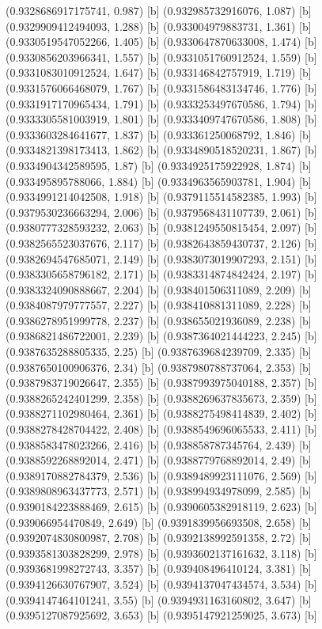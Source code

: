 {{{(0.9328686917175741, 0.987) [b] 
(0.932985732916076, 1.087) [b] 
(0.9329909412494093, 1.288) [b] 
(0.933004979883731, 1.361) [b] 
(0.9330519547052266, 1.405) [b] 
(0.9330647870633008, 1.474) [b] 
(0.9330856203966341, 1.557) [b] 
(0.9331051760912524, 1.559) [b] 
(0.9331083010912524, 1.647) [b] 
(0.933146842757919, 1.719) [b] 
(0.9331576066468079, 1.767) [b] 
(0.9331586483134746, 1.776) [b] 
(0.9331917170965434, 1.791) [b] 
(0.9333253497670586, 1.794) [b] 
(0.9333305581003919, 1.801) [b] 
(0.9333409747670586, 1.808) [b] 
(0.9333603284641677, 1.837) [b] 
(0.933361250068792, 1.846) [b] 
(0.9334821398173413, 1.862) [b] 
(0.9334890518520231, 1.867) [b] 
(0.9334904342589595, 1.87) [b] 
(0.9334925175922928, 1.874) [b] 
(0.933495895788066, 1.884) [b] 
(0.9334963565903781, 1.904) [b] 
(0.9334991214042508, 1.918) [b] 
(0.9379115514582385, 1.993) [b] 
(0.9379530236663294, 2.006) [b] 
(0.9379568431107739, 2.061) [b] 
(0.9380777328593232, 2.063) [b] 
(0.9381249550815454, 2.097) [b] 
(0.9382565523037676, 2.117) [b] 
(0.9382643859430737, 2.126) [b] 
(0.9382694547685071, 2.149) [b] 
(0.9383073019907293, 2.151) [b] 
(0.9383305658796182, 2.171) [b] 
(0.9383314874842424, 2.197) [b] 
(0.9383324090888667, 2.204) [b] 
(0.938401506311089, 2.209) [b] 
(0.9384087979777557, 2.227) [b] 
(0.938410881311089, 2.228) [b] 
(0.9386278951999778, 2.237) [b] 
(0.938655021936089, 2.238) [b] 
(0.9386821486722001, 2.239) [b] 
(0.9387364021444223, 2.245) [b] 
(0.9387635288805335, 2.25) [b] 
(0.9387639684239709, 2.335) [b] 
(0.9387650100906376, 2.34) [b] 
(0.9387980788737064, 2.353) [b] 
(0.9387983719026647, 2.355) [b] 
(0.9387993975040188, 2.357) [b] 
(0.9388265242401299, 2.358) [b] 
(0.9388269637835673, 2.359) [b] 
(0.9388271102980464, 2.361) [b] 
(0.9388275498414839, 2.402) [b] 
(0.9388278428704422, 2.408) [b] 
(0.9388549696065533, 2.411) [b] 
(0.9388583478023266, 2.416) [b] 
(0.938858787345764, 2.439) [b] 
(0.9388592268892014, 2.471) [b] 
(0.9388779768892014, 2.49) [b] 
(0.9389170882784379, 2.536) [b] 
(0.9389489923111076, 2.569) [b] 
(0.9389808963437773, 2.571) [b] 
(0.938994934978099, 2.585) [b] 
(0.9390184223888469, 2.615) [b] 
(0.9390605382918119, 2.623) [b] 
(0.939066954470849, 2.649) [b] 
(0.9391839956693508, 2.658) [b] 
(0.9392074830800987, 2.708) [b] 
(0.9392138992591358, 2.72) [b] 
(0.9393581303828299, 2.978) [b] 
(0.9393602137161632, 3.118) [b] 
(0.9393681998272743, 3.357) [b] 
(0.939408496410124, 3.381) [b] 
(0.9394126630767907, 3.524) [b] 
(0.9394137047434574, 3.534) [b] 
(0.9394147464101241, 3.55) [b] 
(0.9394931163160802, 3.647) [b] 
(0.9395127087925692, 3.653) [b] 
(0.9395147921259025, 3.673) [b] 
}}}
